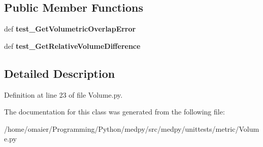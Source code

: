 \subsection*{Public Member Functions}
\begin{DoxyCompactItemize}
\item 
\hypertarget{classmedpy_1_1unittests_1_1metric_1_1Volume_1_1TestVolumeClass_a2f291c94d8dd72c2eafd5bfddd2eab5c}{
def {\bfseries test\_\-GetVolumetricOverlapError}}
\label{classmedpy_1_1unittests_1_1metric_1_1Volume_1_1TestVolumeClass_a2f291c94d8dd72c2eafd5bfddd2eab5c}

\item 
\hypertarget{classmedpy_1_1unittests_1_1metric_1_1Volume_1_1TestVolumeClass_a9a007c447b6c90567f15f4a601a1aff7}{
def {\bfseries test\_\-GetRelativeVolumeDifference}}
\label{classmedpy_1_1unittests_1_1metric_1_1Volume_1_1TestVolumeClass_a9a007c447b6c90567f15f4a601a1aff7}

\end{DoxyCompactItemize}


\subsection{Detailed Description}


Definition at line 23 of file Volume.py.



The documentation for this class was generated from the following file:\begin{DoxyCompactItemize}
\item 
/home/omaier/Programming/Python/medpy/src/medpy/unittests/metric/Volume.py\end{DoxyCompactItemize}
